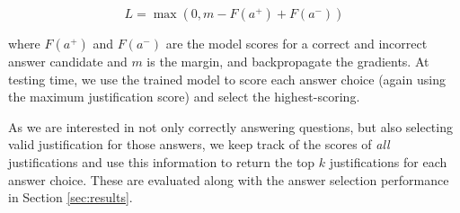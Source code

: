 \begin{equation}
L = \max(0, m - F(a^{+}) + F(a^{-}))
\end{equation}

where $F(a^+)$ and $F(a^-)$ are the model scores for a correct and incorrect answer candidate and $m$ is the margin, and backpropagate the gradients.
At testing time, we use the trained model to score each answer choice (again using the maximum justification score) and select the highest-scoring.

As we are interested in not only correctly answering questions, but also selecting valid justification for those answers, we keep track of the scores of \emph{all} justifications and use this information to return the top $k$ justifications for each answer choice.  These are evaluated along with the answer selection performance in Section \ref{sec:results}.
